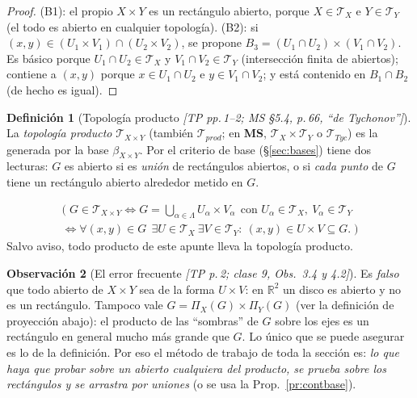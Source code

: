 \documentclass[11pt,a4paper]{article}
\newcommand{\lgc}[1]{\par\vspace{-3pt}\begin{gather*}\big(\;#1\;\big)\end{gather*}\vspace{-6pt}}
\theoremstyle{definition}
\newtheorem{definicion}{Definición}[section]
\newtheorem{observacion}[definicion]{Observación}
\theoremstyle{plain}
\newcommand{\fnt}[1]{{\normalfont\small\itshape\color{gray!150!black}[#1]}}
\newcommand{\R}{\mathbb{R}}
\newcommand{\tp}{\mathcal{T}}
\begin{document}
\begin{proof}
(B1): el propio $X\times Y$ es un rectángulo abierto, porque $X\in\tp_X$ e $Y\in\tp_Y$ (el todo es abierto en cualquier topología). (B2): si $(x,y)\in(U_1\times V_1)\cap(U_2\times V_2)$, se propone $B_3=(U_1\cap U_2)\times(V_1\cap V_2)$. Es básico porque $U_1\cap U_2\in\tp_X$ y $V_1\cap V_2\in\tp_Y$ (intersección finita de abiertos); contiene a $(x,y)$ porque $x\in U_1\cap U_2$ e $y\in V_1\cap V_2$; y está contenido en $B_1\cap B_2$ (de hecho es igual).
\end{proof}

\begin{definicion}[Topología producto \fnt{TP pp.\,1--2; MS \S5.4, p.\,66, ``de Tychonov''}]
La \emph{topología producto} $\tp_{X\times Y}$ (también $\tp_{prod}$; en \textbf{MS}, $\tp_X\times\tp_Y$ o $\tp_{Tyc}$) es la generada por la base $\beta_{X\times Y}$. Por el criterio de base (\S\ref{sec:bases}) tiene dos lecturas: $G$ es abierto si es \emph{unión} de rectángulos abiertos, o si \emph{cada punto} de $G$ tiene un rectángulo abierto alrededor metido en $G$.
\lgc{G\in\tp_{X\times Y}\iff G=\bigcup_{\alpha\in\Lambda}U_\alpha\times V_\alpha\ \ \text{con } U_\alpha\in\tp_X,\ V_\alpha\in\tp_Y\\
\iff \forall (x,y)\in G\ \ \exists U\in\tp_X\ \exists V\in\tp_Y:\ (x,y)\in U\times V\subseteq G.}
Salvo aviso, todo producto de este apunte lleva la topología producto.
\end{definicion}

\begin{observacion}[El error frecuente \fnt{TP p.\,2; clase 9, Obs.\ 3.4 y 4.2}]\label{ob:errorprod}
Es \emph{falso} que todo abierto de $X\times Y$ sea de la forma $U\times V$: en $\R^2$ un disco es abierto y no es un rectángulo. Tampoco vale $G=\Pi_X(G)\times\Pi_Y(G)$ (ver la definición de proyección abajo): el producto de las ``sombras'' de $G$ sobre los ejes es un rectángulo en general mucho más grande que $G$. Lo único que se puede asegurar es lo de la definición. Por eso el método de trabajo de toda la sección es: \emph{lo que haya que probar sobre un abierto cualquiera del producto, se prueba sobre los rectángulos y se arrastra por uniones} (o se usa la Prop.~\ref{pr:contbase}).
\end{observacion}
\end{document}
